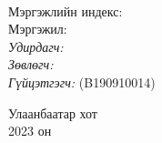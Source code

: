 \begin{titlepage}
\begin{center}

{\scshape\LARGE \univname\par} %
{\scshape\Large \facname\par}\vspace{0.5cm} %

\vspace{2cm}
\hfill \large{\deptname} \\

\vspace{2cm}

{\huge \bfseries \ttitle\par}\vspace{0.4cm} %

\vspace{2cm}

\begin{minipage}[t] {0.9\textwidth}
\begin{flushleft} 
\normalsize

Мэргэжлийн индекс: \degreeid \\
Мэргэжил: \degreename \\[2cm]

\emph{Удирдагч:} {\supname}  \\%
\emph{Зөвлөгч:} {\advicename}  \\ %
\emph{Гүйцэтгэгч:} {\shortname} (B190910014) \\ %

\end{flushleft}
\end{minipage}

\vfill

\large {Улаанбаатар хот} \\
{\large 2023 он }\\ %

\end{center}
\end{titlepage}

 
